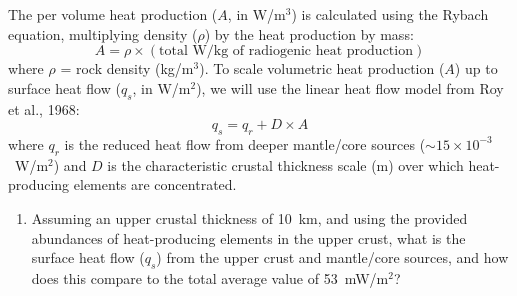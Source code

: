 \documentclass{template}
\newcommand{\solution}[1]{%
\iftoggle{showanswers}{%
\begin{solutionbox}
        #1
\end{solutionbox}%
  }{}%
}
\begin{document}
\begin{enumerate}[label=\textbf{\arabic*.}]
The per volume heat production ($A$, in W/m$^3$) is calculated using the Rybach equation, multiplying density ($\rho$) by the heat production by mass:
\begin{equation}
A = \rho \times (\text{total W/kg of radiogenic heat production})
\label{eq:Rybach}
\end{equation}
where $\rho$ = rock density (kg/m$^3$). To scale volumetric heat production ($A$) up to surface heat flow ($q_s$, in W/m$^2$), we will use the linear heat flow model from Roy et al., 1968:
\begin{equation}
q_s = q_r + D \times A
\label{eq:linear-heat-flow}
\end{equation}
where $q_r$ is the reduced heat flow from deeper mantle/core sources ($\sim 15\times10^{-3}$~W/m$^2$) and $D$ is the characteristic crustal thickness scale (m) over which heat-producing elements are concentrated.

\newpage
\begin{enumerate}[label=\alph*)]
\item Assuming an upper crustal thickness of 10~km, and using the provided abundances of heat-producing elements in the upper crust, what is the surface heat flow ($q_s$) from the upper crust and mantle/core sources, and how does this compare to the total average value of 53~mW/m$^2$?
\solution{

    Convert $C_{\text{K}} = 2.5$~wt\% to mass fraction:

    $$ C_{\text{K}} / 100 = 0.025 $$

    Given that $\mu\unit{\g\per\g}$ is the same as parts per million, we can convert $C_{\text{U}}$ and $C_{\text{Th}}$ to mass fraction per kg of rock by dividing by $10^6$:

    $$ C_{\text{U}} / 10^6 = \num{2.8e-6} $$

    $$ C_{\text{Th}} / 10^6 = \num{1.07e-5} $$


    \textbf{U:}
    \begin{align*}
        A_{\text{U}} &= \rho \times \qty{9.52e-5}{\W\per\kg} \\
        &= (\qty{2700}{\kg\per\cubic\metre})(\qty{9.52e-5}{\W\per\kg}) \cdot \num{2.8e-6}\\
        &= \qty{7.19712e-7}{\W\per\cubic\metre}
    \end{align*}

    \textbf{Th:}
    \begin{align*}
        A_{\text{Th}} &= \rho \times \qty{2.56e-5}{\W\per\kg} \\
        &= (\qty{2700}{\kg\per\cubic\metre})(\qty{2.56e-5}{\W\per\kg}) \cdot \num{1.07e-5} \\
        &= \qty{7.39584e-7}{\W\per\cubic\metre}
    \end{align*}

}
\end{enumerate}
\end{enumerate}
\end{document}
